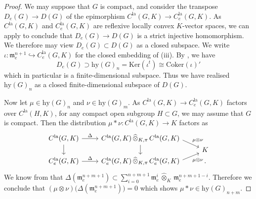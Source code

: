 \documentclass[a4paper, reqno, 10pt]{amsart}
\theoremstyle{definition}
\numberwithin{equation}{section}
\newcommand{\Coker}{{\mathrm{Coker}}}
\newcommand{\cotimes}[1]{{\,\widehat{\otimes}_{#1}\,}}
\newcommand{\hy}{{\mathrm{hy}}}
\newcommand{\Ker}{{\mathrm{Ker}}}
\newcommand{\la}{{\mathrm{la}}}
\newcommand{\projcotimes}{{\,\widehat{\otimes}_{K,\pi}\,}}
\newcommand{\ra}{\rightarrow}
\newcommand{\Fm}{{\mathfrak {m}}}
\begin{document}
\begin{proof}
	We may suppose that $G$ is compact, and consider the transpose $D_e(G) \ra D(G)$ of the epimorphism $C^\la(G,K) \ra C^\la_e(G,K)$.
	As $C^\la(G,K)$ and $C^\la_e(G,K)$ are reflexive locally convex $K$-vector spaces, we can apply \cite[IV.\ \S 4.2 Cor.\ 1]{Bourbaki87TopVectSp1to5} to conclude that $D_e(G) \ra D(G)$ is a strict injective homomorphism. We therefore may view $D_e(G) \subset D(G)$ as a closed subspace.
	We write $\iota \colon \Fm_e^{n+1} \hookrightarrow C^\la_e(G,K)$ for the closed embedding of  (iii).
	By \cite[IV.\ \S 4.1 Prop.\ 2]{Bourbaki87TopVectSp1to5}, we have
	\begin{equation*}
		D_e(G) \supset \hy(G)_n = \Ker(\iota^t) \cong \Coker(\iota)'
	\end{equation*}
	which in particular is a finite-dimensional subspace.
	Thus we have realised $\hy(G)_n$ as a closed finite-dimensional subspace of $D(G)$.
	
	Now let $\mu \in \hy(G)_n$ and $\nu \in \hy(G)_m$.
	As $C^\la(G,K)\ra C^\la_e(G,K)$ factors over $C^\la(H,K)$, for any compact open subgroup $H\subset G$, we may assume that $G$ is compact.
	Then the distribution $\mu \ast \nu \colon C^\la(G,K) \ra K$ factors as
	\begin{equation*}
		\begin{tikzcd}[row sep = 0ex]
			C^\la(G,K) \ar[r, "\Delta"] \ar[dd] &C^\la(G,K) \projcotimes C^\la(G,K) \ar[rd, start anchor=358, end anchor = 155, "\mu \otimes \nu"] \ar[dd] & \\
			&&K \\
			C^\la_e(G,K) \ar[r, "\Delta"] &C^\la_e(G,K) \projcotimes C^\la_e(G,K) \ar[ru, start anchor = 2, end anchor=205, "\mu \otimes \nu"'] &.
		\end{tikzcd}
	\end{equation*}
	We know from  that $\Delta(\Fm_e^{n+m+1}) \subset \sum_{i=0}^{n+m+1} \Fm_e^i \cotimes{K} \Fm_e^{n+m+1-i}$.
	Therefore we conclude that $(\mu \otimes \nu)\big(\Delta(\Fm_e^{n+m+1}) \big) = 0$ which shows $\mu \ast \nu \in \hy(G)_{n+m}$.
\end{proof}
\end{document}
